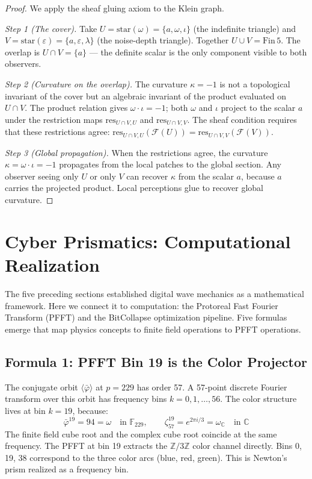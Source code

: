 \documentclass[12pt,oneside]{article}
\theoremstyle{principia}
\theoremstyle{definition}
\theoremstyle{remark}
\providecommand{\CC}{\mathbb{C}}
\providecommand{\ZZ}{\mathbb{Z}}
\providecommand{\FF}{\mathbb{F}}
\providecommand{\vpbar}{\bar{\varphi}}
\begin{document}
\begin{proof}
We apply the sheaf gluing axiom to the Klein graph.

\emph{Step 1 (The cover).} Take $U = \mathrm{star}(\omega) = \{a, \omega, \iota\}$ (the indefinite triangle) and $V = \mathrm{star}(\varepsilon) = \{a, \varepsilon, \lambda\}$ (the noise-depth triangle). Together $U \cup V = \mathrm{Fin}\,5$. The overlap is $U \cap V = \{a\}$ --- the definite scalar is the only component visible to both observers.

\emph{Step 2 (Curvature on the overlap).} The curvature $\kappa = -1$ is not a topological invariant of the cover but an algebraic invariant of the product evaluated on $U \cap V$. The product relation gives $\omega \cdot \iota = -1$; both $\omega$ and $\iota$ project to the scalar $a$ under the restriction maps $\mathrm{res}_{U \cap V, U}$ and $\mathrm{res}_{U \cap V, V}$. The sheaf condition requires that these restrictions agree: $\mathrm{res}_{U \cap V, U}(\mathcal{F}(U)) = \mathrm{res}_{U \cap V, V}(\mathcal{F}(V))$.

\emph{Step 3 (Global propagation).} When the restrictions agree, the curvature $\kappa = \omega \cdot \iota = -1$ propagates from the local patches to the global section. Any observer seeing only $U$ or only $V$ can recover $\kappa$ from the scalar $a$, because $a$ carries the projected product. Local perceptions glue to recover global curvature. \qedhere
\end{proof}

\section{Cyber Prismatics: Computational Realization}

The five preceding sections established digital wave mechanics as a mathematical framework. Here we connect it to computation: the Protoreal Fast Fourier Transform (PFFT) and the BitCollapse optimization pipeline. Five formulas emerge that map physics concepts to finite field operations to PFFT operations.

\subsection{Formula 1: PFFT Bin 19 is the Color Projector}

The conjugate orbit $\langle \vpbar \rangle$ at $p = 229$ has order 57. A 57-point discrete Fourier transform over this orbit has frequency bins $k = 0, 1, \ldots, 56$. The color structure lives at bin $k = 19$, because:
\begin{equation}\label{eq:color_projector}
\vpbar^{19} = 94 = \omega \quad \text{in } \FF_{229}, \qquad \zeta_{57}^{19} = e^{2\pi i/3} = \omega_\CC \quad \text{in } \CC
\end{equation}
The finite field cube root and the complex cube root coincide at the same frequency. The PFFT at bin 19 extracts the $\ZZ/3\ZZ$ color channel directly. Bins 0, 19, 38 correspond to the three color arcs (blue, red, green). This is Newton's prism realized as a frequency bin.
\end{document}
